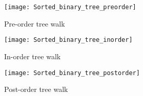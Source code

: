 \begin{figure}[h]
	\centering
	\begin{minipage}{0.3\textwidth}
		\centering
		\texttt{[image: Sorted\_binary\_tree\_preorder]}
		\caption{Pre-order tree walk}
	\end{minipage}
	\hfill
	\begin{minipage}{0.3\textwidth}
		\centering
		\texttt{[image: Sorted\_binary\_tree\_inorder]}
		\caption{In-order tree walk}
	\end{minipage}
	\hfill
	\begin{minipage}{0.3\textwidth}
		\centering
		\texttt{[image: Sorted\_binary\_tree\_postorder]}
		\caption{Post-order tree walk}
	\end{minipage}	
\end{figure}